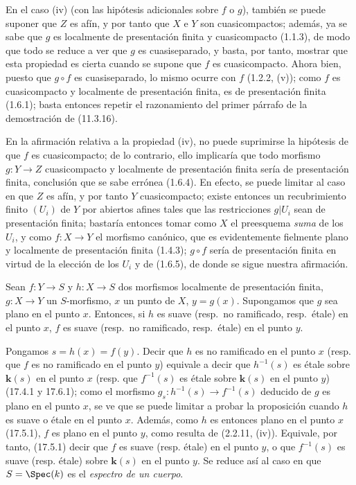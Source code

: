 En el caso (iv) (con las hipótesis adicionales sobre $f$ o $g$), también se puede suponer que $Z$ es afín, y por tanto que $X$ e $Y$ son cuasicompactos; además, ya se sabe que $g$ es localmente de presentación finita y cuasicompacto (1.1.3), de modo que todo se reduce a ver que $g$ es cuasiseparado, y basta, por tanto, mostrar que esta propiedad es cierta cuando se supone que $f$ es cuasicompacto. Ahora bien, puesto que $g\circ f$ es cuasiseparado, lo mismo ocurre con $f$ (1.2.2, (v)); como $f$ es cuasicompacto y localmente de presentación finita, es de presentación finita (1.6.1); basta entonces repetir el razonamiento del primer párrafo de la demostración de (11.3.16).

\begin{remark}[17.7.6]
\label{IV.17.7.6}
En la afirmación relativa a la propiedad (iv), no puede suprimirse la hipótesis de que $f$ es cuasicompacto; de lo contrario, ello implicaría que todo morfismo $g:Y\to Z$ cuasicompacto y localmente de presentación finita sería de presentación finita, conclusión que se sabe errónea (1.6.4). En efecto, se puede limitar al caso en que $Z$ es afín, y por tanto $Y$ cuasicompacto; existe entonces un recubrimiento finito $(U_i)$ de $Y$ por abiertos afines tales que las restricciones $g|U_i$ sean de presentación finita; bastaría entonces tomar como $X$ el preesquema \emph{suma} de los $U_i$, y como $f:X\to Y$ el morfismo canónico, que es evidentemente fielmente plano y localmente de presentación finita (1.4.3); $g\circ f$ sería de presentación finita en virtud de la elección de los $U_i$ y de (1.6.5), de donde se sigue nuestra afirmación.
\end{remark}

\begin{proposition}[17.7.7]
\label{IV.17.7.7}
Sean $f:Y\to S$ y $h:X\to S$ dos morfismos localmente de presentación finita, $g:X\to Y$ un $S$-morfismo, $x$ un punto de $X$, $y=g(x)$. Supongamos que $g$ sea \textup{plano} en el punto $x$. Entonces, si $h$ es suave \textup{(resp.}\ no ramificado, \textup{resp.}\ étale\textup{)} en el punto $x$, $f$ es suave \textup{(resp.}\ no ramificado, \textup{resp.}\ étale\textup{)} en el punto $y$.
\end{proposition}

Pongamos $s=h(x)=f(y)$. Decir que $h$ es no ramificado en el punto $x$ (resp. que $f$ es no ramificado en el punto $y$) equivale a decir que $h^{-1}(s)$ es étale sobre $\boldsymbol{k}(s)$ en el punto $x$ (resp. que $f^{-1}(s)$ es étale sobre $\boldsymbol{k}(s)$ en el punto $y$) (17.4.1 y 17.6.1); como el morfismo $g_s:h^{-1}(s)\to f^{-1}(s)$ deducido de $g$ es plano en el punto $x$, se ve que se puede limitar a probar la proposición cuando $h$ es suave o étale en el punto $x$. Además, como $h$ es entonces plano en el punto $x$ (17.5.1), $f$ es plano en el punto $y$, como resulta de (2.2.11, (iv)). Equivale, por tanto, (17.5.1) decir que $f$ es suave (resp. étale) en el punto $y$, o que $f^{-1}(s)$ es suave (resp. étale) sobre $\boldsymbol{k}(s)$ en el punto $y$. Se reduce así al caso en que $S=\Spec(k)$ es el \emph{espectro de un cuerpo}.

